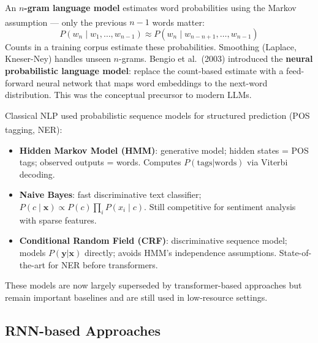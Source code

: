 \begin{tcbitemize}[ skin=sectionraster ]
    \tcbitem[title={N-gram Language Models}, raster multicolumn=3]
    An \textbf{$n$-gram language model} estimates word probabilities using the Markov assumption --- only the previous $n-1$ words matter\textsuperscript{\cite[][]{bengioNeuralProbabilisticLanguage}}:
    \begin{equation}
        P(w_n \mid w_1, \ldots, w_{n-1}) \approx P(w_n \mid w_{n-n+1}, \ldots, w_{n-1})
    \end{equation}
    Counts in a training corpus estimate these probabilities.
    Smoothing (Laplace, Kneser-Ney) handles unseen $n$-grams.
    Bengio et al.\ (2003) introduced the \textbf{neural probabilistic language model}: replace the count-based estimate with a feed-forward neural network that maps word embeddings to the next-word distribution.
    This was the conceptual precursor to modern LLMs.

    \tcbitem[title={Sequence Models: HMM and CRF}, raster multicolumn=3]
    Classical NLP used probabilistic sequence models for structured prediction (POS tagging, NER)\textsuperscript{\cite[][p.~6]{dhamaniIntroductionGenerativeAI2024}}:
    \begin{itemize}
        \item \textbf{Hidden Markov Model (HMM)}: generative model; hidden states = POS tags; observed outputs = words.
              Computes $P(\text{tags}|\text{words})$ via Viterbi decoding.
        \item \textbf{Naive Bayes}: fast discriminative text classifier;
              $P(c \mid \mathbf{x}) \propto P(c) \prod_i P(x_i \mid c)$.
              Still competitive for sentiment analysis with sparse features.
        \item \textbf{Conditional Random Field (CRF)}: discriminative sequence model; models $P(\mathbf{y}|\mathbf{x})$ directly; avoids HMM's independence assumptions.
              State-of-the-art for NER before transformers.
    \end{itemize}
    These models are now largely superseded by transformer-based approaches but remain important baselines and are still used in low-resource settings.
\end{tcbitemize}

\subsection{RNN-based Approaches}

